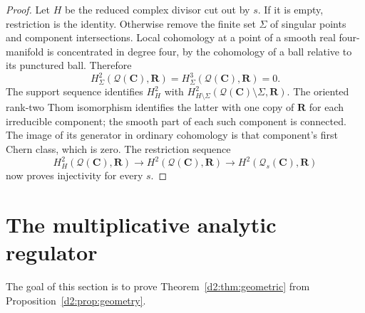 \documentclass[11pt,a4paper]{amsart}
\numberwithin{equation}{section}
\theoremstyle{definition}
\theoremstyle{remark}
\newcommand{\DtwoRR}{\mathbf{R}}
\newcommand{\DtwoCC}{\mathbf{C}}
\newcommand{\DtwocQ}{\mathcal Q}
\begin{document}
\begin{proof}
Let \(H\) be the reduced complex divisor cut out by \(s\).
If it is empty, restriction is the identity.
Otherwise remove the finite set \(\Sigma\) of singular points and
component intersections.
Local cohomology at a point of a smooth real four-manifold is
concentrated in degree four, by the cohomology of a ball relative to
its punctured ball. Therefore
\[
 H^2_\Sigma(\DtwocQ(\DtwoCC),\DtwoRR)
 =H^3_\Sigma(\DtwocQ(\DtwoCC),\DtwoRR)=0.
\]
The support sequence identifies \(H^2_H\) with
\(H^2_{H\setminus\Sigma}(\DtwocQ(\DtwoCC)\setminus\Sigma,\DtwoRR)\).
The oriented rank-two Thom isomorphism identifies the latter with
one copy of \(\DtwoRR\) for each irreducible component; the smooth part
of each such component is connected.
The image of its generator in ordinary cohomology is that component's
first Chern class, which is zero.
The restriction sequence
\[
 H^2_H(\DtwocQ(\DtwoCC),\DtwoRR)\longrightarrow H^2(\DtwocQ(\DtwoCC),\DtwoRR)
 \longrightarrow H^2(\DtwocQ_s(\DtwoCC),\DtwoRR)
\]
now proves injectivity for every \(s\).
\end{proof}

\section{The multiplicative analytic regulator}\label{d2:sec:analytic}

The goal of this section is to prove Theorem~\ref{d2:thm:geometric} from
Proposition~\ref{d2:prop:geometry}.
\end{document}
